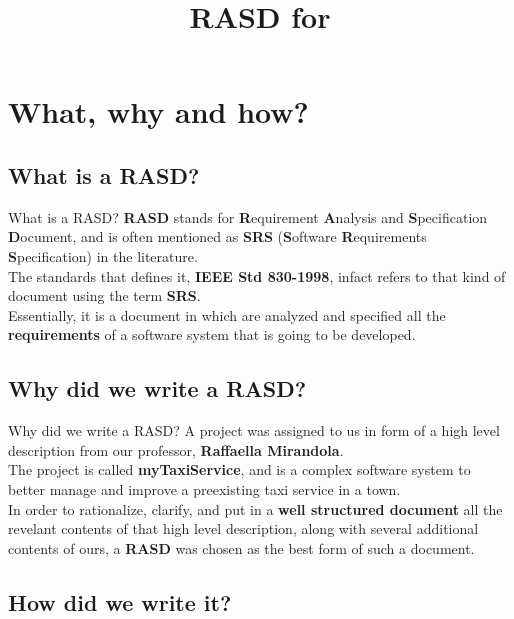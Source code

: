 \documentclass{../common/latex_classes/pdf_presentation}
\title{RASD for \myTaxiService{}}
\begin{document}
	
	\titleToc{}

	\section{What, why and how?}
	
	\subsection{What is a RASD?}
	
	\begin{frame}{What is a RASD?}
		\textbf{RASD} stands for \textbf{R}equirement \textbf{A}nalysis and \textbf{S}pecification \textbf{D}ocument, and is often mentioned as \textbf{SRS} (\textbf{S}oftware \textbf{R}equirements \textbf{S}pecification) in the literature.\\
		The standards that defines it, \textbf{IEEE Std 830-1998}, infact refers to that kind of document using the term \textbf{SRS}.\\
		Essentially, it is a document in which are analyzed and specified all the \textbf{requirements} of a software system that is going to be developed.
	\end{frame}
	
	\subsection{Why did we write a RASD?}
	
	\begin{frame}{Why did we write a RASD?}
		A project was assigned to us in form of a high level description from our professor, \textbf{Raffaella Mirandola}.\\
		The project is called \textbf{myTaxiService}, and is a complex software system to better manage and improve a preexisting taxi service in a town.\\
		In order to rationalize, clarify, and put in a \textbf{well structured document} all the revelant contents of that high level description, along with several additional contents of ours, a \textbf{RASD} was chosen as the best form of such a document.\\
	\end{frame}
	
	\subsection{How did we write it?}
	
\end{document}
